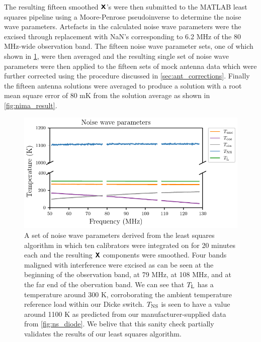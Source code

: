 The resulting fifteen smoothed $\textbf{\textsf{X}}$'s were then submitted to the MATLAB least squares pipeline using a Moore-Penrose pseudoinverse to determine the noise wave parameters. Artefacts in the calculated noise wave parameters were the excised through replacement with NaN’s corresponding to 6.2 MHz of the 80 MHz-wide observation band. The fifteen noise wave parameter sets, one of which shown in \cref{fig:ls_nwps}, were then averaged and the resulting single set of noise wave parameters were then applied to the fifteen sets of mock antenna data which were further corrected using the procedure discussed in \cref{sec:ant_corrections}. Finally the fifteen antenna solutions were averaged to produce a solution with a root mean square error of 80 mK from the solution average as shown in \cref{fig:nima_result}.
\begin{figure}
    \centering
    \includegraphics[width=.8\textwidth]{ls_nwps}
    \caption{A set of noise wave parameters derived from the least squares algorithm in which ten calibrators were integrated on for 20 minutes each and the resulting $\textbf{\textsf{X}}$ components were smoothed. Four bands maligned with interference were excised as can be seen at the beginning of the observation band, at 79 MHz, at 108 MHz, and at the far end of the obervation band. We can see that $T_{\mathrm{L}}$ has a temperature around 300 K, corroborating the ambient temperature reference load within our Dicke switch. $T_{\mathrm{NS}}$ is seen to have a value around 1100 K as predicted from our manufacturer-supplied data from \cref{fig:ns_diode}. We belive that this sanity check partially validates the results of our least squares algorithm.}
    \label{fig:ls_nwps}
\end{figure}
